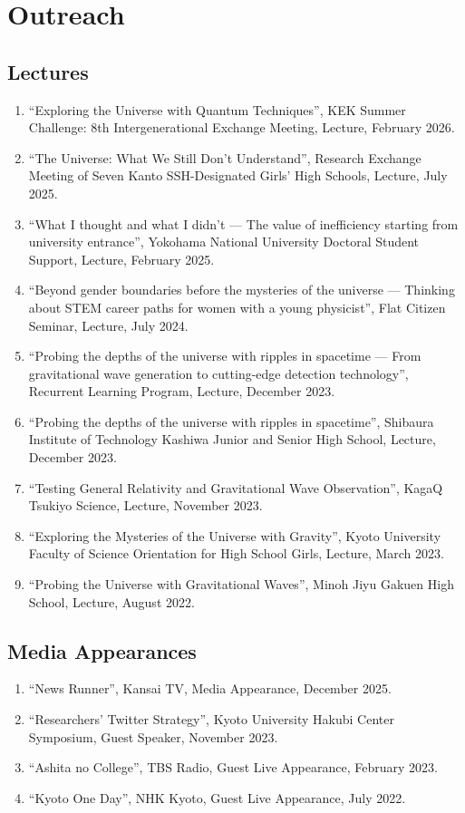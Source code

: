 \documentclass[uplatex, 12pt]{article}
\begin{document}

\section*{Outreach}
\subsection*{Lectures}
\begin{enumerate}
\item “Exploring the Universe with Quantum Techniques”, KEK Summer Challenge: 8th Intergenerational Exchange Meeting, Lecture, February 2026.
\item “The Universe: What We Still Don't Understand”, Research Exchange Meeting of Seven Kanto SSH-Designated Girls' High Schools, Lecture, July 2025.
\item “What I thought and what I didn’t --- The value of inefficiency starting from university entrance”, Yokohama National University Doctoral Student Support, Lecture, February 2025.
\item “Beyond gender boundaries before the mysteries of the universe --- Thinking about STEM career paths for women with a young physicist”, Flat Citizen Seminar, Lecture, July 2024.
\item “Probing the depths of the universe with ripples in spacetime --- From gravitational wave generation to cutting-edge detection technology”, Recurrent Learning Program, Lecture, December 2023.
\item “Probing the depths of the universe with ripples in spacetime”, Shibaura Institute of Technology Kashiwa Junior and Senior High School, Lecture, December 2023.
\item “Testing General Relativity and Gravitational Wave Observation”, KagaQ Tsukiyo Science, Lecture, November 2023.
\item “Exploring the Mysteries of the Universe with Gravity”, Kyoto University Faculty of Science Orientation for High School Girls, Lecture, March 2023.
\item “Probing the Universe with Gravitational Waves”, Minoh Jiyu Gakuen High School, Lecture, August 2022.
\end{enumerate}
\subsection*{Media Appearances}
\begin{enumerate}
\item “News Runner”, Kansai TV, Media Appearance, December 2025.
\item “Researchers’ Twitter Strategy”, Kyoto University Hakubi Center Symposium, Guest Speaker, November 2023.
\item “Ashita no College”, TBS Radio, Guest Live Appearance, February 2023.
\item “Kyoto One Day”, NHK Kyoto, Guest Live Appearance, July 2022.
\end{enumerate}
\end{document}
